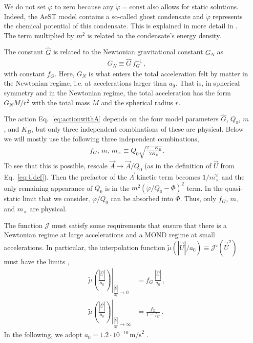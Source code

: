 \documentclass[reprint, amsmath,amssymb, nofootinbib, aps, prd]{revtex4-2}
\begin{document}
We do not set $\dot{\varphi}$ to zero because any $\dot{\varphi} = \mathrm{const}$ also allows for static solutions.
Indeed, the AeST model contains a so-called ghost condensate and $\dot{\varphi}$ represents the chemical potential of this condensate.
This is explained in more detail in \cite{Mistele2023}.
The term multiplied by $m^2$ is related to the condensate's energy density.

The constant $\hat{G}$ is related to the Newtonian gravitational constant $G_N$ as
\begin{align}
 \label{eq:fGdef}
 G_N \equiv \hat{G} \, f_G^{-1} \,,
\end{align}
with constant $f_G$.
Here, $G_N$ is what enters the total acceleration felt by matter in the Newtonian regime, i.e. at accelerations larger than $a_0$.
That is, in spherical symmetry and in the Newtonian regime, the total acceleration has the form $G_N M/r^2$ with the total mass $M$ and the spherical radius $r$.

The action Eq.~\eqref{eq:actionwithA} depends on the four model parameters $\hat{G}$, $Q_0$, $m$, and $K_B$, but only three independent combinations of these are physical.
Below we will mostly use the following three independent combinations,
\begin{align}
f_G, \, m, \,  m_\times \equiv Q_0 \sqrt{\frac{2-K_B}{2 K_B}}.
\end{align}
To see that this is possible, rescale $\vec{A} \to \vec{A}/Q_0$ (as in the definition of $\vec{U}$ from Eq.~\eqref{eq:Udef}).
Then the prefactor of the $\vec{A}$ kinetic term becomes $1/m_\times^2$ and the only remaining appearance of $Q_0$ is in the $m^2(\dot{\varphi}/Q_0 - \Phi)^2$ term.
In the quasi-static limit that we consider, $\dot{\varphi}/Q_0$ can be absorbed into $\Phi$.
Thus, only $f_G$, $m$, and $m_\times$ are physical.

The function $\mathcal{J}$ must satisfy some requirements that ensure that there is a Newtonian regime at large accelerations and a MOND regime at small accelerations.
In particular, the interpolation function $\tilde{\mu}(|\vec{U}|/a_0) \equiv \mathcal{J}'(\vec{U}^2)$ must have the limits \citep{Skordis2020, Famaey2012},
\begin{subequations}
\label{eq:mutildelimits}
\begin{align}
 \left.\tilde{\mu}\left(\frac{|\vec{U}|}{a_0}\right)\right|_{\frac{|\vec{U}|}{a_0} \to 0} &= f_G \, \frac{|\vec{U}|}{a_0} \,, \\
 \left.\tilde{\mu}\left(\frac{|\vec{U}|}{a_0}\right)\right|_{\frac{|\vec{U}|}{a_0} \to \infty} &= \frac{f_G}{1-f_G} \,.
\end{align}
\end{subequations}
In the following, we adopt $a_0 = 1.2 \cdot 10^{-10}\,\mathrm{m/s}^2$ \citep{Lelli2017b}.
\end{document}
